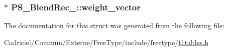 \hypertarget{struct_p_s___blend_rec___ae3dcbb2aaee676fdc3d5bde890b2cc78}{
\subsubsection[{weight\-\_\-vector}]{$\ast$ P\-S\-\_\-\-Blend\-Rec\-\_\-\-::weight\-\_\-vector}}\label{struct_p_s___blend_rec___ae3dcbb2aaee676fdc3d5bde890b2cc78}


The documentation for this struct was generated from the following file\-:\begin{DoxyCompactItemize}
\item 
Cadriciel/\-Commun/\-Externe/\-Free\-Type/include/freetype/\hyperlink{t1tables_8h}{t1tables.\-h}\end{DoxyCompactItemize}
